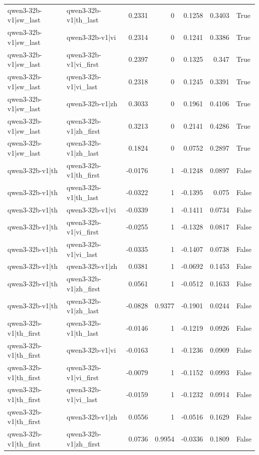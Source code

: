 \begin{table}
\begin{tabular}{l l r r r r l}
qwen3-32b-v1|sw_last & qwen3-32b-v1|th_last & 0.2331 & 0 & 0.1258 & 0.3403 & True \\
qwen3-32b-v1|sw_last & qwen3-32b-v1|vi & 0.2314 & 0 & 0.1241 & 0.3386 & True \\
qwen3-32b-v1|sw_last & qwen3-32b-v1|vi_first & 0.2397 & 0 & 0.1325 & 0.347 & True \\
qwen3-32b-v1|sw_last & qwen3-32b-v1|vi_last & 0.2318 & 0 & 0.1245 & 0.3391 & True \\
qwen3-32b-v1|sw_last & qwen3-32b-v1|zh & 0.3033 & 0 & 0.1961 & 0.4106 & True \\
qwen3-32b-v1|sw_last & qwen3-32b-v1|zh_first & 0.3213 & 0 & 0.2141 & 0.4286 & True \\
qwen3-32b-v1|sw_last & qwen3-32b-v1|zh_last & 0.1824 & 0 & 0.0752 & 0.2897 & True \\
qwen3-32b-v1|th & qwen3-32b-v1|th_first & -0.0176 & 1 & -0.1248 & 0.0897 & False \\
qwen3-32b-v1|th & qwen3-32b-v1|th_last & -0.0322 & 1 & -0.1395 & 0.075 & False \\
qwen3-32b-v1|th & qwen3-32b-v1|vi & -0.0339 & 1 & -0.1411 & 0.0734 & False \\
qwen3-32b-v1|th & qwen3-32b-v1|vi_first & -0.0255 & 1 & -0.1328 & 0.0817 & False \\
qwen3-32b-v1|th & qwen3-32b-v1|vi_last & -0.0335 & 1 & -0.1407 & 0.0738 & False \\
qwen3-32b-v1|th & qwen3-32b-v1|zh & 0.0381 & 1 & -0.0692 & 0.1453 & False \\
qwen3-32b-v1|th & qwen3-32b-v1|zh_first & 0.0561 & 1 & -0.0512 & 0.1633 & False \\
qwen3-32b-v1|th & qwen3-32b-v1|zh_last & -0.0828 & 0.9377 & -0.1901 & 0.0244 & False \\
qwen3-32b-v1|th_first & qwen3-32b-v1|th_last & -0.0146 & 1 & -0.1219 & 0.0926 & False \\
qwen3-32b-v1|th_first & qwen3-32b-v1|vi & -0.0163 & 1 & -0.1236 & 0.0909 & False \\
qwen3-32b-v1|th_first & qwen3-32b-v1|vi_first & -0.0079 & 1 & -0.1152 & 0.0993 & False \\
qwen3-32b-v1|th_first & qwen3-32b-v1|vi_last & -0.0159 & 1 & -0.1232 & 0.0914 & False \\
qwen3-32b-v1|th_first & qwen3-32b-v1|zh & 0.0556 & 1 & -0.0516 & 0.1629 & False \\
qwen3-32b-v1|th_first & qwen3-32b-v1|zh_first & 0.0736 & 0.9954 & -0.0336 & 0.1809 & False \\

\end{tabular}
\end{table}
